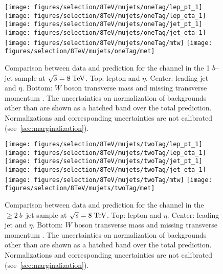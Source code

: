 \begin{figure}
  \centering
  \texttt{[image: figures/selection/8TeV/mujets/oneTag/lep\_pt\_1]}
  \texttt{[image: figures/selection/8TeV/mujets/oneTag/lep\_eta\_1]}
  \texttt{[image: figures/selection/8TeV/mujets/oneTag/jet\_pt\_1]}
  \texttt{[image: figures/selection/8TeV/mujets/oneTag/jet\_eta\_1]}
  \texttt{[image: figures/selection/8TeV/mujets/oneTag/mtw]}
  \texttt{[image: figures/selection/8TeV/mujets/oneTag/met]}
  \caption{
    Comparison between data and prediction for the \mujets{}
    channel in the 1 $b$--jet sample at $\sqrt{s} = 8 \; \mathrm{TeV}{}$. Top: lepton \pt{} and
    $\eta$. Center: leading jet \pt{} and $\eta$. Bottom: $W$ boson
    transverse mass \mtw{} and missing transverse momentum \met{}.
    The uncertainties on normalization of backgrounds other than
    \wjets{} are shown as a hatched band over the total prediction.
    Normalizations and corresponding uncertainties are not calibrated
    (see~\ref{sec:marginalization}).
   }
  \label{fig:2012mu_1tag}
\end{figure}
%
\begin{figure}
  \centering
  \texttt{[image: figures/selection/8TeV/mujets/twoTag/lep\_pt\_1]}
  \texttt{[image: figures/selection/8TeV/mujets/twoTag/lep\_eta\_1]}
  \texttt{[image: figures/selection/8TeV/mujets/twoTag/jet\_pt\_1]}
  \texttt{[image: figures/selection/8TeV/mujets/twoTag/jet\_eta\_1]}
  \texttt{[image: figures/selection/8TeV/mujets/twoTag/mtw]}
  \texttt{[image: figures/selection/8TeV/mujets/twoTag/met]}
  \caption{
    Comparison between data and prediction for the \mujets{}
    channel in the $\geq2~b$--jet sample at $\sqrt{s} = 8 \; \mathrm{TeV}{}$. Top: lepton \pt{} and
    $\eta$. Center: leading jet \pt{} and $\eta$. Bottom: $W$ boson
    transverse mass \mtw{} and missing transverse momentum \met{}.
    The uncertainties on normalization of backgrounds other than
    \wjets{} are shown as a hatched band over the total prediction.
    Normalizations and corresponding uncertainties are not calibrated
    (see~\ref{sec:marginalization}).
  }
  \label{fig:2012mu_2tag}
\end{figure}

